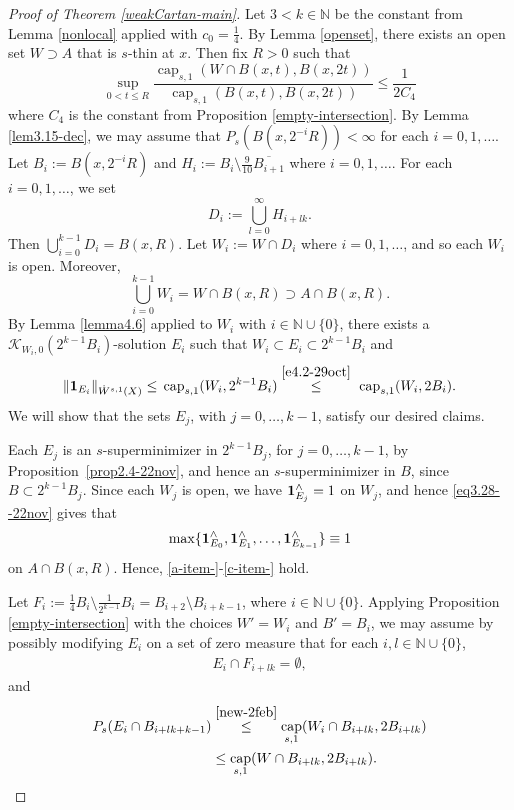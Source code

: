 \documentclass[11pt,leqno]{amsart}
\numberwithin{equation}{section}
\theoremstyle{definition}
\DeclareMathOperator{\capp}{cap}
\newcommand{\caps}{\capp_{s,1}}
\begin{document}
	\begin{proof}[Proof of Theorem \ref{weakCartan-main}]
		Let $3< k\in\mathbb N$ be the constant from Lemma \ref{nonlocal} applied with $c_0=\frac{1}{4}$. 
		By Lemma \ref{openset}, there exists an open set $W\supset A$ that is $s$-thin at $x$.
		Then fix $R>0$ such that
		\begin{equation}\label{eq3.27-22nov}
			\sup_{0<t\leq R} \frac{\caps(W\cap B(x,t), B(x,2t))}{\caps(B(x,t),B(x,2t))}\leq \frac{1}{2C_4}
		\end{equation}
		where $C_4$ is the constant from Proposition \ref{empty-intersection}. By Lemma \ref{lem3.15-dec}, we may assume that  $P_s(B(x, 2^{-i}R))<\infty$ for each $i=0,1,\ldots$.
		Let $B_i:=B(x,2^{-i}R)$ and  $H_i:=B_i\setminus \frac{9}{10} \overline{B_{i+1}}$ where $i=0,1,\ldots$. For each $i=0,1,\ldots$, we set
		\[
		D_i:= \bigcup_{l=0}^\infty H_{i+lk}.
		\]
		Then $\bigcup_{i=0}^{k-1}D_i=B(x,R)$. Let $W_i:=W\cap D_i$ where $i=0,1,\ldots$,
		and so each $W_i$ is open.
		Moreover,
		\begin{equation}\label{eq3.28--22nov}
			\bigcup_{i=0}^{k-1}W_i=W\cap B(x,R)\supset A\cap B(x,R).
		\end{equation}
		By Lemma \ref{lemma4.6} applied to $W_i$ with $i\in \mathbb N\cup\{0\}$, there exists a $\mathcal{K}_{W_i,0}(2^{k-1}B_i)$-solution $E_i$  such that  $W_i\subset E_i\subset 2^{k-1}B_i$ and 
		\begin{align}
			\|{\bf 1}_{E_i}\|_{\dot W^{s,1}(X)}\leq\,  {\rm cap}_{s,1}(W_i,2^{k-1}B_i) 
			\overset{\eqref{e4.2-29oct}}{\leq} \ {\rm cap}_{s,1}(W_i,2B_i) \label{eq5.20-19nov}.
		\end{align}
		We will show that the sets $E_j$, with $j=0,\ldots, k-1$, satisfy our desired claims.
		
		
		
		Each $E_j$ is an $s$-superminimizer 
		{in $2^{k-1}B_j$, }
		for $j=0,\ldots, k-1$,
		by Proposition~\ref{prop2.4-22nov}, and hence an $s$-superminimizer 
		{in  $B$, }
		since $B \subset 2^{k-1}B_j$.
		Since each $W_j$ is open, we have ${\bf 1}_{E_j}^\wedge=1$ on $W_j$, and  hence \eqref{eq3.28--22nov} gives that 
		\[
		\max\{ {\bf 1}_{E_0}^\wedge, {\bf 1}_{E_1}^\wedge,\ldots,{\bf 1}_{E_{k-1}}^\wedge\} \equiv 1
		\]
		on $A\cap B(x,R)$.
		Hence, \ref{a-item-}-\ref{c-item-} hold.
		
		Let $F_{i}:=\frac{1}{4}B_{i}\setminus \frac{1}{2^{k-1}}B_{i}=B_{i+2}\setminus B_{i+k-1}$, where $i\in\mathbb N\cup\{0\}$.  Applying Proposition \ref{empty-intersection} with the choices
		$W'=W_i$ and $B'=B_i$,
		we may assume by possibly modifying $E_i$ on a set of zero measure that for each  $i,l\in\mathbb N\cup\{0\}$,
		\begin{align}\label{eq5.21-19nov}
			E_i\cap F_{i+lk}=\emptyset,
		\end{align}
		and
		\begin{align}
			P_s(E_i\cap B_{i+lk+k-1}) 
			&\overset{\eqref{new-2feb}}{\le} 
			\caps(W_i\cap B_{i+lk}, 2B_{i+lk})\notag\\
			&\le \caps(W\cap B_{i+lk}, 2B_{i+lk}).
			\label{eq3.32-24Jan}
		\end{align}
		

\end{proof}
\end{document}

